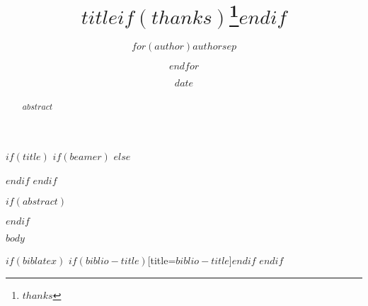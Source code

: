 \documentclass[
$if(fontsize)$
  $fontsize$,
$endif$
$if(lang)$
  $babel-lang$,
$endif$
$if(papersize)$
  $papersize$paper,
$endif$
$for(classoption)$
  $classoption$$sep$,
$endfor$
]{article}
\title{$title$$if(thanks)$\thanks{$thanks$}$endif$}
\author{$for(author)$$author$$sep$ \and $endfor$}
\date{}
\date{$date$}
\begin{document}
$if(title)$
$if(beamer)$
\frame{\titlepage}
$else$
\maketitle
$endif$
$endif$

$if(abstract)$
\begin{abstract}
$abstract$
\end{abstract}
$endif$

$body$

$if(biblatex)$
\printbibliography$if(biblio-title)$[title=$biblio-title$]$endif$
$endif$
\end{document}
